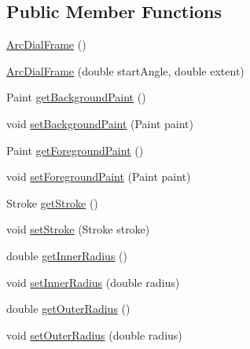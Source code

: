 \subsection*{Public Member Functions}
\begin{DoxyCompactItemize}
\item 
\mbox{\hyperlink{classorg_1_1jfree_1_1chart_1_1plot_1_1dial_1_1_arc_dial_frame_ad280d48cff3ab29c83481e1bfd5ac888}{Arc\+Dial\+Frame}} ()
\item 
\mbox{\hyperlink{classorg_1_1jfree_1_1chart_1_1plot_1_1dial_1_1_arc_dial_frame_a597b7197cdab97d7816fb1ec128302ba}{Arc\+Dial\+Frame}} (double start\+Angle, double extent)
\item 
Paint \mbox{\hyperlink{classorg_1_1jfree_1_1chart_1_1plot_1_1dial_1_1_arc_dial_frame_a6f3e72c03452c65f7bd85a00e589eebe}{get\+Background\+Paint}} ()
\item 
void \mbox{\hyperlink{classorg_1_1jfree_1_1chart_1_1plot_1_1dial_1_1_arc_dial_frame_ac61fd04399b1f4f5c80d18edfb84c88b}{set\+Background\+Paint}} (Paint paint)
\item 
Paint \mbox{\hyperlink{classorg_1_1jfree_1_1chart_1_1plot_1_1dial_1_1_arc_dial_frame_a918c4dd5e80bc020ee7491ade8bf874a}{get\+Foreground\+Paint}} ()
\item 
void \mbox{\hyperlink{classorg_1_1jfree_1_1chart_1_1plot_1_1dial_1_1_arc_dial_frame_a5f5ee601d06bf9d0c0e447b8ec3ec969}{set\+Foreground\+Paint}} (Paint paint)
\item 
Stroke \mbox{\hyperlink{classorg_1_1jfree_1_1chart_1_1plot_1_1dial_1_1_arc_dial_frame_af33103b26b734123d651717a5e6068e3}{get\+Stroke}} ()
\item 
void \mbox{\hyperlink{classorg_1_1jfree_1_1chart_1_1plot_1_1dial_1_1_arc_dial_frame_a3b03da2588e0393015a12a9f69d34bb7}{set\+Stroke}} (Stroke stroke)
\item 
double \mbox{\hyperlink{classorg_1_1jfree_1_1chart_1_1plot_1_1dial_1_1_arc_dial_frame_abb7997fb0e86fb41d6e760b230b71a24}{get\+Inner\+Radius}} ()
\item 
void \mbox{\hyperlink{classorg_1_1jfree_1_1chart_1_1plot_1_1dial_1_1_arc_dial_frame_a08db4e0ceed0203c47767b810a199e0b}{set\+Inner\+Radius}} (double radius)
\item 
double \mbox{\hyperlink{classorg_1_1jfree_1_1chart_1_1plot_1_1dial_1_1_arc_dial_frame_a7f3b8ed6a85161689a6bad89a5c29b0a}{get\+Outer\+Radius}} ()
\item 
void \mbox{\hyperlink{classorg_1_1jfree_1_1chart_1_1plot_1_1dial_1_1_arc_dial_frame_a67c4b353c0c1e5d7cbd4b230d0df688c}{set\+Outer\+Radius}} (double radius)

\end{DoxyCompactItemize}
